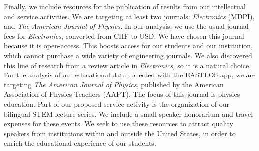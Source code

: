 \documentclass[../../main.tex]{subfiles}
\begin{document}
Finally, we include resources for the publication of results from our intellectual and service activities.  We are targeting at least two journals: \textit{Electronics} (MDPI), and \textit{The American Journal of Physics.} In our analysis, we use the usual journal fees for \textit{Electronics}, converted from CHF to USD.  We have chosen this journal because it is open-access.  This boosts access for our students and our institution, which cannot purchase a wide variety of engineering journals.  We also discovered this line of research from a review article in \textit{Electronics,} so it is a natural choice.  For the analysis of our educational data collected with the EASTLOS app, we are targeting \textit{The American Journal of Physics}, published by the American Association of Physics Teachers (AAPT).  The focus of this journal is physics education.  Part of our proposed service activity is the organization of our bilingual STEM lecture series.  We include a small speaker honorarium and travel expenses for these events.  We seek to use these resources to attract quality speakers from institutions within and outside the United States, in order to enrich the educational experience of our students. \\ \vspace{2.5mm}
\end{document}
